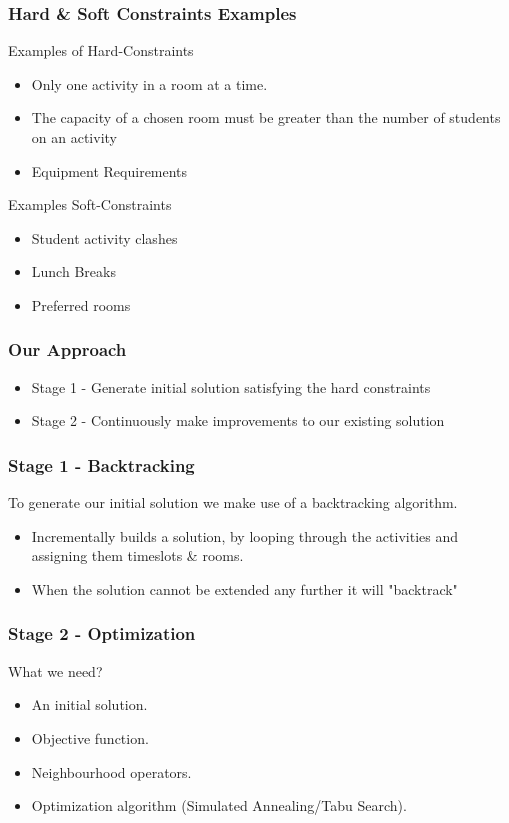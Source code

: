 \documentclass{beamer}
\begin{document}
\begin{frame}
	\frametitle{Hard \& Soft Constraints Examples}
	Examples of Hard-Constraints
	
	\begin{itemize}
		\item Only one activity in a room at a time.
		
		\item The capacity of a chosen room must be greater than the number of students on an activity
		
		\item Equipment Requirements
	\end{itemize}
	
	Examples Soft-Constraints
	
	\begin{itemize}
		\item Student activity clashes
		\item Lunch Breaks
		\item Preferred rooms
	\end{itemize}
	
\end{frame}

\begin{frame}
	\frametitle{Our Approach}
	
	\begin{itemize}
		\item Stage 1 - Generate initial solution satisfying the hard constraints
		\item Stage 2 - Continuously make improvements to our existing solution
	\end{itemize}
\end{frame}

\begin{frame}
	\frametitle{Stage 1 - Backtracking}
	To generate our initial solution we make use of a backtracking algorithm.
	
	\begin{itemize}
		\item Incrementally builds a solution, by looping through the activities and assigning them timeslots \& rooms.
		\item When the solution cannot be extended any further it will "backtrack"
	\end{itemize}
	
\end{frame}

\begin{frame}
	\frametitle{Stage 2 - Optimization}
	What we need?
	
	\begin{itemize}
		\item An initial solution.
		\item Objective function.
		\item Neighbourhood operators.
		\item Optimization algorithm (Simulated Annealing/Tabu Search).
	\end{itemize}
	
\end{frame}
\end{document}
